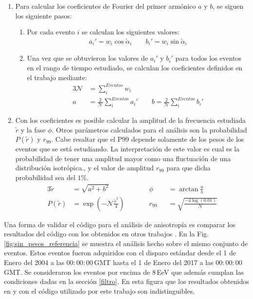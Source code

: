 \begin{enumerate}
        \item Para calcular los coeficientes de Fourier del primer armónico $a$ y $b$, se siguen los siguiente pasos:
        \begin{enumerate}
          \item Por cada evento  $i$ se calculan los siguientes valores:
          \begin{align}
             a_i' = {w_i}\cos\tilde{\alpha}_i \qquad
             b_i' = {w_i}\sin\tilde{\alpha}_i
         \end{align}
         \item Una vez que se obtuvieron los valores de $a_i'$ y $b_i'$ para todos los eventos en el rango de tiempo estudiado, se calculan los coeficientes definidos en el trabajo \cite{analisis_fourier} mediante:
         \begin{alignat}{3}
          \mathcal{N} &= \sum^{Eventos}_i w_i \\
            a &= \frac{2}{\mathcal{N}} \sum^{Eventos}_i a_i' \qquad
            b = \frac{2}{\mathcal{N}} \sum^{Eventos}_i b_i'  
         \end{alignat}
        \end{enumerate}
        \item Con los coeficientes es posible calcular la amplitud de la frecuencia estudiada $\tilde{r}$ y la fase $\phi$. Otros parámetros calculados para el análisis son la probabilidad $P(\tilde{r})$  y $r_{99}$. Cabe resaltar que el P99 depende solamente de los pesos de los eventos que se está estudiando. La interpretación  de este valor es cual es la probabilidad de tener una amplitud mayor como una fluctuación de una distribución isotrópica., y el valor de amplitud $r_{99}$ para que dicha probabilidad sea del $1$\%. 
        \begin{alignat}{3}
            \tilde{r} &= \sqrt{a^2 +b^2}             
               \qquad &&   \phi&&= \arctan\frac{a}{b}\\
          P(\tilde{r})&= \exp(-\mathcal{N}\frac{\tilde{r}^2}{4}) 
             \qquad &&   r_{99}&&= \sqrt{\frac{-4\log(0.01)}{\mathcal{N}}}
        \end{alignat}

      \end{enumerate}

    Una forma de validar el código para el análisis de anisotropía es comparar los resultados del código con los obtenidos en otros trabajos \cite{taborda}. En la Fig.\ref{fig:sin_pesos_referencia} se muestra el análisis hecho sobre el mismo conjunto de eventos. Estos eventos fueron adquiridos con el disparo estándar desde el 1 de Enero del 2004 a las $00:00:00\,$GMT  hasta el 1 de Enero del 2017 a las $00:00:00\,$GMT. Se consideraron los eventos por encima de $8\,$EeV que además cumplan las condiciones dadas en la sección \ref{filtro}.  En esta figura que los resultados obtenidos en \cite{taborda} y con el código utilizado por este trabajo son indistinguibles. 

